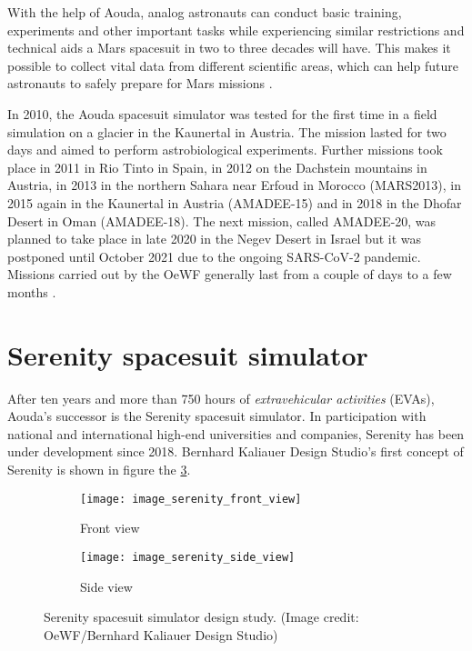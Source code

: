 With the help of Aouda, analog astronauts can conduct basic training, experiments and other important tasks while experiencing similar restrictions and technical aids a Mars spacesuit in two to three decades will have. This makes it possible to collect vital data from different scientific areas, which can help future astronauts to safely prepare for Mars missions \cite{OeWF:2019_history}.

In 2010, the Aouda spacesuit simulator was tested for the first time in a field simulation on a glacier in the Kaunertal in Austria. The mission lasted for two days and aimed to perform astrobiological experiments. Further missions took place in 2011 in Rio Tinto in Spain, in 2012 on the Dachstein mountains in Austria, in 2013 in the northern Sahara near Erfoud in Morocco (MARS2013), in 2015 again in the Kaunertal in Austria (AMADEE-15) and in 2018 in the Dhofar Desert in Oman (AMADEE-18). The next mission, called AMADEE-20, was planned to take place in late 2020 in the Negev Desert in Israel but it was postponed until October 2021 due to the ongoing SARS-CoV-2 pandemic. Missions carried out by the OeWF generally last from a couple of days to a few months \cite{OeWF:2019_missions, Israel:2020}.

\section{Serenity spacesuit simulator}
After ten years and more than 750 hours of \emph{extravehicular activities} (EVAs), Aouda's successor is the Serenity spacesuit simulator. In participation with national and international high-end universities and companies, Serenity has been under development since 2018. Bernhard Kaliauer Design Studio's first concept of Serenity is shown in figure the \ref{fig:serenity_design_study}.
\begin{figure}[h!]
	\centering
	\begin{subfigure}[b]{0.47\textwidth}
		\centering
		\texttt{[image: image\_serenity\_front\_view]}
		\caption{Front view}
		\label{fig:image_serenity_front_view}
	\end{subfigure}
	\hspace{5pt}%
	\begin{subfigure}[b]{0.47\textwidth}
		\centering
		\texttt{[image: image\_serenity\_side\_view]}
		\caption{Side view}
		\label{fig:image_serenity_side_view}
	\end{subfigure}
	\caption{Serenity spacesuit simulator design study. (Image credit: OeWF/Bernhard Kaliauer Design Studio)}
	\label{fig:serenity_design_study}
\end{figure}

